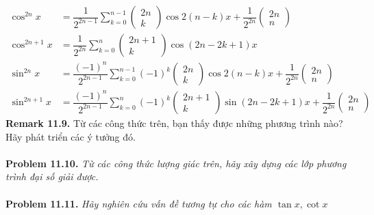 \documentclass[a4paper,oneside]{book}
\numberwithin{equation}{chapter}
\begin{document}
\begin{align}
{\cos ^{2n}}x &= \dfrac{1}{{{2^{2n - 1}}}}\sum\limits_{k = 0}^{n - 1} {\left( {\begin{array}{*{20}{c}}
{2n}\\
k
\end{array}} \right)\cos 2\left( {n - k} \right)x}  + \dfrac{1}{{{2^{2n}}}}\left( {\begin{array}{*{20}{c}}
{2n}\\
n
\end{array}} \right)\\
{\cos ^{2n + 1}}x &= \dfrac{1}{{{2^{2n}}}}\sum\limits_{k = 0}^n {\left( {\begin{array}{*{20}{c}}
{2n + 1}\\
k
\end{array}} \right)\cos \left( {2n - 2k + 1} \right)x} \\
{\sin ^{2n}}x &= \dfrac{{{{\left( { - 1} \right)}^n}}}{{{2^{2n - 1}}}}\sum\limits_{k = 0}^{n - 1} {{{\left( { - 1} \right)}^k}\left( {\begin{array}{*{20}{c}}
{2n}\\
k
\end{array}} \right)\cos 2\left( {n - k} \right)x + \dfrac{1}{{{2^{2n}}}}} \left( {\begin{array}{*{20}{c}}
{2n}\\
n
\end{array}} \right)\\
{\sin ^{2n + 1}}x &= \dfrac{{{{\left( { - 1} \right)}^n}}}{{{2^{2n - 1}}}}\sum\limits_{k = 0}^n {{{\left( { - 1} \right)}^k}\left( {\begin{array}{*{20}{c}}
{2n + 1}\\
k
\end{array}} \right)\sin \left( {2n - 2k + 1} \right)x + \dfrac{1}{{{2^{2n}}}}} \left( {\begin{array}{*{20}{c}}
{2n}\\
n
\end{array}} \right)
\end{align}
\textbf{Remark 11.9.} Từ các công thức trên, bạn thấy được những phương trình nào? Hãy phát triển các ý tưởng đó.\\
\\
\textbf{Problem 11.10.} \textit{Từ các công thức lượng giác trên, hãy xây dựng các lớp phương trình đại số giải được.}\\
\\
\textbf{Problem 11.11.} \textit{Hãy nghiên cứu vấn đề tương tự cho các hàm $\tan x,\cot x$}\\
\end{document}
